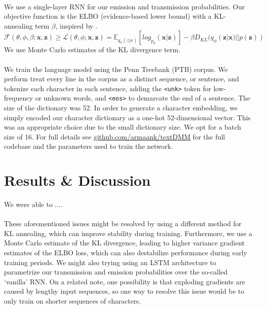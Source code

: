 \documentclass[justified,nobib]{tufte-handout}
\begin{document}
\begin{fullwidth}
\paragraph{}
 We use a single-layer RNN for our emission and transmission probabilities. Our objective function is the ELBO (evidence-based lower bound) with a KL-annealing term $\beta$, inspired by \cite{bvae}.
 \begin{equation}
\mathcal{F}(\theta,\phi,\beta;\bm{x},\bm{z}) \geq \mathcal{L}(\theta,\phi;\bm{x},\bm{z}) = \mathbb{E}_{q_{\phi}(z|x)}[log_{p_{\theta}}(\bm{x}|\bm{z})]-\beta D_{KL}(q_{\phi}(\bm{z}|\bm{x})||p(\bm{z}))
\end{equation} 
We use Monte Carlo estimates of the KL divergence term. 
\paragraph{} We train the language model using the Penn Treebank (PTB) corpus. We perform treat every line in the corpus as a distinct sequence, or sentence, and tokenize each character in each sentence, adding the \texttt{<unk>} token for low-frequency or unknown words, and \texttt{<eos>} to demarcate the end of a sentence. The size of the dictionary was 52. In order to generate a character embedding, we simply encoded our character dictionary as a one-hot 52-dimensional vector. This was an appropriate choice due to the small dictionary size. We opt for a batch size of 16. For full details see \underline{\href{https://github.com/armaank/textDMM}{github.com/armaank/textDMM}} for the full codebase and the parameters used to train the network. 

\section{Results \& Discussion}

\paragraph{} We were able to ....

\paragraph{} These aforementioned issues might be resolved by using a different method for KL annealing, which can improve stability during training. Furthermore, we use a Monte Carlo estimate of the KL divergence, leading to higher variance gradient estimates of the ELBO loss, which can also destabilize performance during early training periods. We might also trying using an LSTM architecture to parametrize our transmission and emission probabilities over the so-called `vanilla' RNN. On a related note, one possibility is that exploding gradients are caused by lengthy input sequences, so one way to resolve this issue would be to only train on shorter sequences of characters. 


\end{fullwidth}
\end{document}
